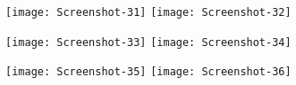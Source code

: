 \begin{figure}[ht]
    \centering
	\texttt{[image: Screenshot-31]}
	\texttt{[image: Screenshot-32]}
\end{figure}

\begin{figure}[ht]
    \centering
	\texttt{[image: Screenshot-33]}
	\texttt{[image: Screenshot-34]}
\end{figure}

\begin{figure}[ht]
    \centering
	\texttt{[image: Screenshot-35]}
	\texttt{[image: Screenshot-36]}
\end{figure}

\clearpage
